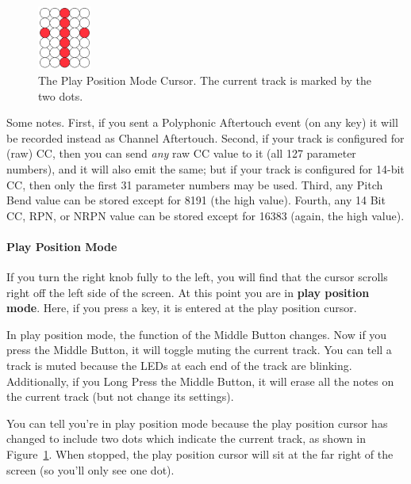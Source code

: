 \documentclass{article}
\begin{document}
\begin{figure}
\vspace{-1em}\hspace{\fill}\includegraphics[width=0.7in]{playpositionmode}\hspace{\fill}%
\vspace{-1em}
\caption{\small The Play Position Mode Cursor.  The current track is marked by the two dots.}
\vspace{-1em}
\label{playpositionmode}
\end{figure}

Some notes.  First, if you sent a Polyphonic Aftertouch event (on any key) it will be recorded instead as Channel Aftertouch.  Second, if your track is configured for (raw) CC, then you can send {\it any} raw CC value to it (all 127 parameter numbers), and it will also emit the same; but if your track is configured for 14-bit CC, then only the first 31 parameter numbers may be used.  Third, any Pitch Bend value can be stored except for 8191 (the high value).  Fourth, any 14 Bit CC, RPN, or NRPN value can be stored except for 16383 (again, the high value).  

\paragraph{Play Position Mode}

If you turn the right knob fully to the left, you will find that the cursor scrolls right off the left side of the screen.  At this point you are in {\bf play position mode}.  Here, if you press a key, it is entered at the play position cursor.

In play position mode, the function of the Middle Button changes.  Now if you press the Middle Button, it will toggle muting the current track.  You can tell a track is muted because the LEDs at each end of the track are blinking.  Additionally, if you Long Press the Middle Button, it will erase all the notes on the current track (but not change its settings).

You can tell you're in play position mode because the play position cursor has changed to include two dots which indicate the current track, as shown in Figure~\ref{playpositionmode}.  When stopped, the play position cursor will sit at the far right of the screen (so you'll only see one dot).
\end{document}
